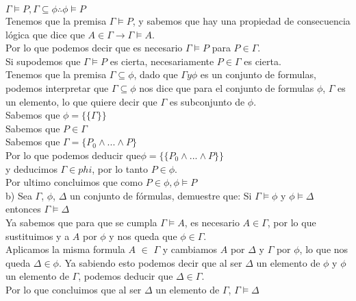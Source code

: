 \documentclass[paper=letter, fontsize=12pt]{scrartcl}
\begin{document}
$\Gamma \models P,\Gamma \subseteq \phi \therefore \phi \models P $\\

Tenemos que la premisa $\Gamma \models P$, y sabemos que hay una propiedad de consecuencia lógica que dice que $A \in \Gamma \rightarrow \Gamma \models A$.\\
Por lo que podemos decir que es necesario $\Gamma \models P$ para $P\in \Gamma$.\\
Si supodemos que $\Gamma \models P$ es cierta, necesariamente $P\in \Gamma$ es cierta.\\

Tenemos que la premisa $\Gamma \subseteq \phi$, dado que $\Gamma y \phi$ es un conjunto de formulas, podemos interpretar que $\Gamma \subseteq \phi$ nos dice que para el conjunto de formulas $\phi$, $\Gamma$ es un elemento, lo que quiere decir que $\Gamma$ es subconjunto de $\phi$.\\

Sabemos que $\phi=\{\{\Gamma \}\}$\\
Sabemos que $P\in \Gamma$\\
Sabemos que $\Gamma=\{P_{0}\wedge...\wedge P\}$\\
Por lo que podemos deducir que$ \phi=\{\{P_{0}\wedge...\wedge P \}\} $\\
y  deducimos $\Gamma \in phi$, por lo tanto $P \in \phi$.\\
Por ultimo concluimos que como $P\in \phi, \phi \models P$\\

b) Sea $\Gamma$, $\phi$, $\Delta$ un conjunto de fórmulas, demuestre que: Si $\Gamma \models \phi$ y $\phi \models \Delta$ entonces $\Gamma \models \Delta$\\

Ya sabemos que para que se cumpla $\Gamma \models A$, es necesario $A \in \Gamma$, por lo que sustituimos y a $A$ por $\phi $ y nos queda que $\phi \in \Gamma$.\\Aplicamos la misma formula $A$ $\in$ $\Gamma$ y cambiamos $A$ por $\Delta$ y $\Gamma$ por $\phi$, lo que nos queda $\Delta \in \phi$. Ya sabiendo esto podemos decir que 
al ser $\Delta$ un elemento de $\phi$ y $\phi$ un elemento de $\Gamma$, podemos deducir que $\Delta \in \Gamma$.\\
Por lo que concluimos que al ser $\Delta$ un elemento de $\Gamma$, $\Gamma \models \Delta$
\end{document}
